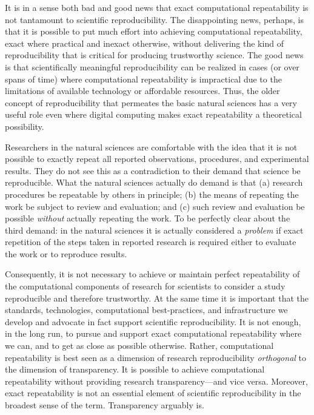 It is in a sense both bad and good news that exact computational repeatability is not tantamount to scientific reproducibility.
The disappointing news, perhaps, is that it is possible to put much effort into achieving computational repeatability,
	exact where practical and inexact otherwise,
	without delivering the kind of reproducibility that is critical for producing trustworthy science.
The good news is that scientifically meaningful reproducibility can be realized in cases (or over spans of time)
	where computational repeatability is impractical due to the limitations of available technology or affordable resources.
Thus, the older concept of reproducibility that permeates the basic natural sciences has a very
	useful role even where digital computing makes exact repeatability a theoretical possibility.

 Researchers in the natural sciences are comfortable with the idea that it is not possible to exactly
	repeat all reported observations, procedures, and experimental results.
They do not see this as a contradiction to their demand that science be reproducible.
What the natural sciences actually do demand is that 
	(a) research procedures be repeatable by others in principle;
	(b) the means of repeating the work be subject to review and evaluation; 
	and (c) such review and evaluation be possible \emph{without} actually repeating the work.
To be perfectly clear about the third demand: in the natural sciences it is actually considered a 
	\emph{problem} if exact repetition of the steps taken in reported research is required either
	to evaluate the work or to reproduce results.

Consequently, it is not necessary to achieve or 
	maintain perfect repeatability of the computational components of research for scientists to 
	consider a study reproducible and therefore trustworthy.
At the same time it is important that the standards, technologies, 
	computational best-practices, and infrastructure we develop and advocate in fact support scientific reproducibility.
It is not enough, in the long run, to pursue and support exact computational repeatability where we can, 
	and to get as close as possible otherwise.
Rather, computational repeatability is best seen as a dimension of research reproducibility \emph{orthogonal} to 
	the dimension of transparency.
It is possible to achieve computational repeatability without providing research transparency---and vice versa.
Moreover, exact repeatability is not an essential element of scientific reproducibility in the broadest sense of the term.
Transparency arguably is.

